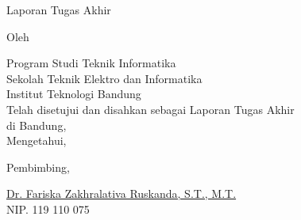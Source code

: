 \clearpage
\pagestyle{empty}

\begin{center}
    \smallskip
    
    \Large \bfseries \MakeUppercase{\thetitle}
    \vfill
    
    \Large Laporan Tugas Akhir
    \vfill
    
    \large Oleh
    
    \Large \theauthor
    
    \large Program Studi Teknik Informatika \\
    
    \normalsize \normalfont
    Sekolah Teknik Elektro dan Informatika \\
    Institut Teknologi Bandung \\
    
    \vfill
    \normalsize \normalfont
    Telah disetujui dan disahkan sebagai Laporan Tugas Akhir\\ 
    di Bandung, \tanggalpengesahan \\
    Mengetahui,
    
    \vspace{0.5cm}
    Pembimbing,
    
    \vfill
    \underline{Dr. Fariska Zakhralativa Ruskanda, S.T., M.T.} \\
    NIP. 119 110 075
    
\end{center}
\clearpage
